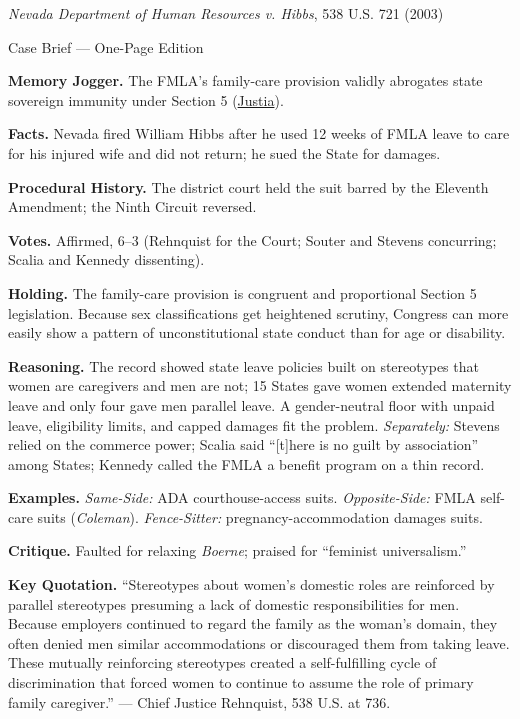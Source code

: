 \documentclass[12pt]{article}
\begin{document}
\begin{center}
{\Large \textit{Nevada Department of Human Resources v. Hibbs}, 538 U.S. 721 (2003)\par}
\vspace{0.3em}
{\normalsize Case Brief --- One-Page Edition\par}
\end{center}

\textbf{Memory Jogger.} The FMLA's family-care provision validly abrogates state sovereign immunity under Section 5 (\href{https://supreme.justia.com/cases/federal/us/538/721/}{Justia}).

\textbf{Facts.} Nevada fired William Hibbs after he used 12 weeks of FMLA leave to care for his injured wife and did not return; he sued the State for damages.

\textbf{Procedural History.} The district court held the suit barred by the Eleventh Amendment; the Ninth Circuit reversed.

\textbf{Votes.} Affirmed, 6--3 (Rehnquist for the Court; Souter and Stevens concurring; Scalia and Kennedy dissenting).

\textbf{Holding.} The family-care provision is congruent and proportional Section 5 legislation. Because sex classifications get heightened scrutiny, Congress can more easily show a pattern of unconstitutional state conduct than for age or disability.

\textbf{Reasoning.} The record showed state leave policies built on stereotypes that women are caregivers and men are not; 15 States gave women extended maternity leave and only four gave men parallel leave. A gender-neutral floor with unpaid leave, eligibility limits, and capped damages fit the problem. \emph{Separately:} Stevens relied on the commerce power; Scalia said ``[t]here is no guilt by association'' among States; Kennedy called the FMLA a benefit program on a thin record.

\textbf{Examples.} \emph{Same-Side:} ADA courthouse-access suits. \emph{Opposite-Side:} FMLA self-care suits (\textit{Coleman}). \emph{Fence-Sitter:} pregnancy-accommodation damages suits.

\textbf{Critique.} Faulted for relaxing \textit{Boerne}; praised for ``feminist universalism.''

\textbf{Key Quotation.} ``Stereotypes about women's domestic roles are reinforced by parallel stereotypes presuming a lack of domestic responsibilities for men. Because employers continued to regard the family as the woman's domain, they often denied men similar accommodations or discouraged them from taking leave. These mutually reinforcing stereotypes created a self-fulfilling cycle of discrimination that forced women to continue to assume the role of primary family caregiver.'' --- Chief Justice Rehnquist, 538 U.S. at 736.
\end{document}
